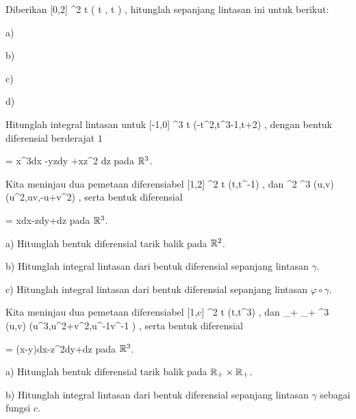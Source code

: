 {}
{

Diberikan
\maabbeledisp {\gamma} { [0,2\pi] } {\R^2
} { t } {( \cos  t , \sin  t )
} {,}
hitunglah
sepanjang lintasan ini untuk
berikut:

a)

b)

c)

d)

}
{} {}

{}
{

Hitunglah integral lintasan
\mathl{\int_\gamma \omega}{} untuk
\maabbeledisp {\gamma} { [-1,0] } {\R^3
} { t } {(-t^2,t^3-1,t+2)
} {,}
dengan bentuk diferensial berderajat $1$

\mavergleichskettedisp
{\vergleichskette
{ \omega
}
{ =} { x^3dx -yzdy +xz^2 dz
}
{ } {
}
{ } {
}
{ } {
}
}
{}{}{}
pada ${\mathbb R}^3$.

}
{} {}

{}
{

Kita meninjau dua pemetaan diferensiabel
\maabbeledisp {\gamma} { [1,2] } {\R^2
} { t } {(t,t^{-1})
} {,}
dan
\maabbeledisp {\varphi} {\R^2} {\R^3
} {(u,v)} {(u^2,uv,-u+v^2)
} {,}
serta bentuk diferensial

\mavergleichskettedisp
{\vergleichskette
{ \omega
}
{ =} { xdx-zdy+dz
}
{ } {
}
{ } {
}
{ } {
}
}
{}{}{}
pada ${\mathbb R}^3$.

a) Hitunglah bentuk diferensial tarik balik
\mathl{\varphi^* \omega}{} pada ${\mathbb R}^2$.

b) Hitunglah integral lintasan dari bentuk diferensial
\mathl{\varphi^* \omega}{} sepanjang lintasan $\gamma$.

c) Hitunglah
 {} {}
integral lintasan dari bentuk diferensial
\mathl{\omega}{} sepanjang lintasan $\varphi \circ \gamma$.

}
{} {}

{}
{

Kita meninjau dua pemetaan diferensiabel
\maabbeledisp {\gamma} { [1,c] } {\R^2
} { t } {(t,t^{3})
} {,}
 {} {}
dan
\maabbeledisp {\varphi} {\R_+ \times \R_+ } {\R^3
} {(u,v)} {(u^3,u^2+v^2,u^{-1}v^{-1} )
} {,}
serta bentuk diferensial

\mavergleichskettedisp
{\vergleichskette
{ \omega
}
{ =} { (x-y)dx-z^2dy+dz
}
{ } {
}
{ } {
}
{ } {
}
}
{}{}{}
pada ${\mathbb R}^3$.

a) Hitunglah bentuk diferensial tarik balik
\mathl{\varphi^* \omega}{} pada ${\mathbb R}_+ \times {\mathbb R}_+$.

b) Hitunglah integral lintasan dari bentuk diferensial
\mathl{\varphi^* \omega}{} sepanjang lintasan $\gamma$ sebagai fungsi $c$.

}
{} {}

